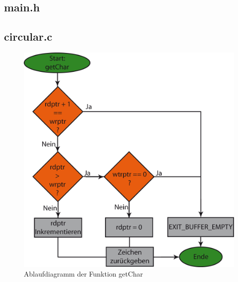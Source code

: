 \subsection{main.h}









\subsection{circular.c}

\begin{figure}[h]
\includegraphics[scale = 0.8]{./getchar.png}
\hspace{-14pt}
\caption{Ablaufdiagramm der Funktion getChar}
\end{figure} 

